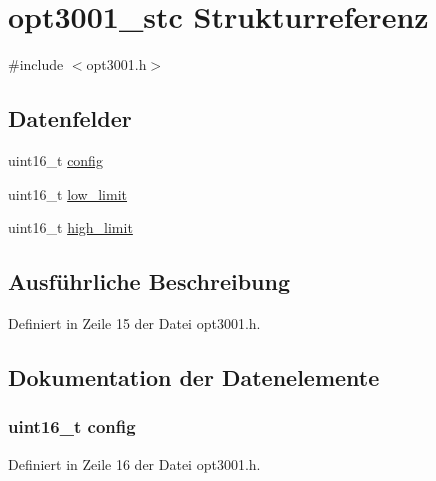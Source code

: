 \hypertarget{structopt3001__stc}{}\section{opt3001\+\_\+stc Strukturreferenz}
\label{structopt3001__stc}


{\ttfamily \#include $<$opt3001.\+h$>$}

\subsection*{Datenfelder}
\begin{DoxyCompactItemize}
\item 
uint16\+\_\+t \hyperlink{structopt3001__stc_aa26297bc57b4b74262246d02175f4308}{config}
\item 
uint16\+\_\+t \hyperlink{structopt3001__stc_a5561e4eedc9af4ceb86ed5056241bf77}{low\+\_\+limit}
\item 
uint16\+\_\+t \hyperlink{structopt3001__stc_af121d4246e275920873b33ad155fa9ba}{high\+\_\+limit}
\end{DoxyCompactItemize}


\subsection{Ausführliche Beschreibung}


Definiert in Zeile 15 der Datei opt3001.\+h.



\subsection{Dokumentation der Datenelemente}
\hypertarget{structopt3001__stc_aa26297bc57b4b74262246d02175f4308}{}
\subsubsection[{config}]{\setlength{\rightskip}{0pt plus 5cm}uint16\+\_\+t config}\label{structopt3001__stc_aa26297bc57b4b74262246d02175f4308}


Definiert in Zeile 16 der Datei opt3001.\+h.

\hypertarget{structopt3001__stc_af121d4246e275920873b33ad155fa9ba}{}
